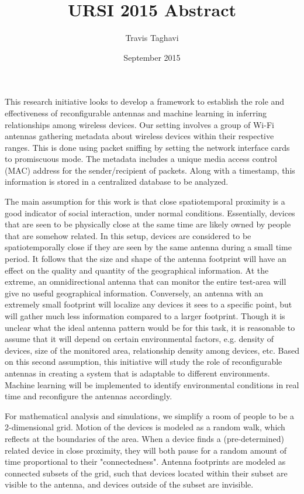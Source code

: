 \documentclass{article}
\title{URSI 2015 Abstract}
\author{Travis Taghavi }
\date{September 2015}
\begin{document}
\maketitle

This research initiative looks to develop a framework to establish the role and effectiveness of reconfigurable antennas and machine learning in inferring relationships among wireless devices. Our setting involves a group of Wi-Fi antennas gathering metadata about wireless devices within their respective ranges. This is done using packet sniffing by setting the network interface cards to promiscuous mode. The metadata includes a unique media access control (MAC) address for the sender/recipient of packets. Along with a timestamp, this information is stored in a centralized database to be analyzed.

\bigskip

The main assumption for this work is that close spatiotemporal proximity is a good indicator of social interaction, under normal conditions. Essentially, devices that are seen to be physically close at the same time are likely owned by people that are somehow related. In this setup, devices are considered to be spatiotemporally close if they are seen by the same antenna during a small time period. It follows that the size and shape of the antenna footprint will have an effect on the quality and quantity of the geographical information. At the extreme, an omnidirectional antenna that can monitor the entire test-area will give no useful geographical information. Conversely, an antenna with an extremely small footprint will localize any devices it sees to a specific point, but will gather much less information compared to a larger footprint. Though it is unclear what the ideal antenna pattern would be for this task, it is reasonable to assume that it will depend on certain environmental factors, e.g. density of devices, size of the monitored area, relationship density among devices, etc. Based on this second assumption, this initiative will study the role of reconfigurable antennas in creating a system that is adaptable to different environments. Machine learning will be implemented to identify environmental conditions in real time and reconfigure the antennas accordingly.

\bigskip

For mathematical analysis and simulations, we simplify a room of people to be a 2-dimensional grid. Motion of the devices is modeled as a random walk, which reflects at the boundaries of the area. When a device finds a (pre-determined) related device in close proximity, they will both pause for a random amount of time proportional to their "connectedness". Antenna footprints are modeled as connected subsets of the grid, such that devices located within their subset are visible to the antenna, and devices outside of the subset are invisible.
\end{document}
